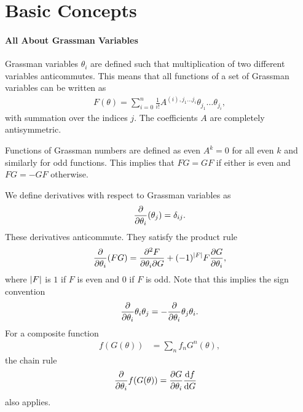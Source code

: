 \section{Basic Concepts}

\paragraph{All About Grassman Variables}
Grassman variables $\theta_{i}$ are defined such that multiplication of two different variables anticommutes. This means that all functions of a set of Grassman variables can be written as
\begin{align*}
	F(\theta) = \sum\limits_{i = 0}^{n}\frac{1}{i!}A^{(i), j_{1}\dots j_{i}}\theta_{j_{1}}\dots\theta_{j_{i}},
\end{align*}
with summation over the indices $j$. The coefficients $A$ are completely antisymmetric.

Functions of Grassman numbers are defined as even $A^{k} = 0$ for all even $k$ and similarly for odd functions. This implies that $FG = GF$ if either is even and $FG = -GF$ otherwise.

We define derivatives with respect to Grassman variables as
\begin{align*}
	\pdv{\theta_{i}}(\theta_{j}) = \delta_{ij}.
\end{align*}
These derivatives anticommute. They satisfy the product rule
\begin{align*}
	\pdv{\theta_{i}}(FG) = \pdv{F}{\theta_{i}}{G} + (-1)^{\abs{F}}F\pdv{G}{\theta_{i}},
\end{align*}
where $\abs{F}$ is $1$ if $F$ is even and $0$ if $F$ is odd. Note that this implies the sign convention
\begin{align*}
	\pdv{\theta_{i}}\theta_{i}\theta_{j} = -\pdv{\theta_{i}}\theta_{j}\theta_{i}.
\end{align*}
For a composite function
\begin{align*}
	f(G(\theta)) &= \sum\limits_{n}f_{n}G^{n}(\theta),
\end{align*}
the chain rule
\begin{align*}
	\pdv{\theta_{i}} f(G(\theta)) &= \pdv{G}{\theta_{i}}\dv{f}{G}
\end{align*}
also applies.

